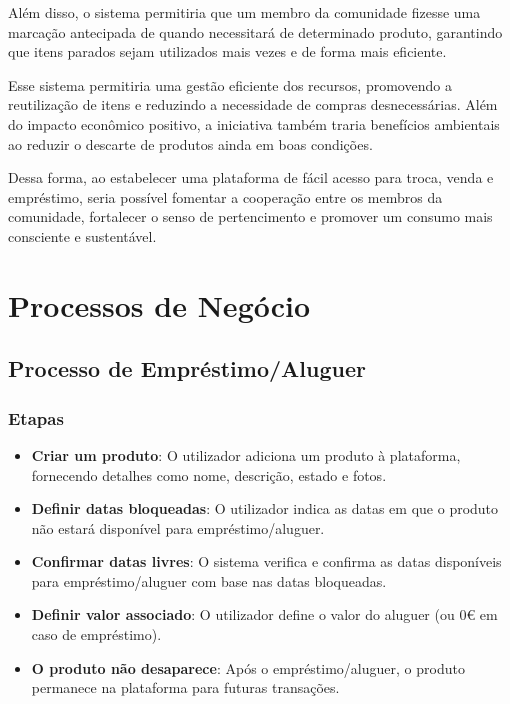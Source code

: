 \documentclass[a4paper, 12pt]{article} %
\begin{document}
Além disso, o sistema permitiria que um membro da comunidade fizesse uma marcação antecipada de quando necessitará de determinado produto, garantindo que itens parados sejam utilizados mais vezes e de forma mais eficiente. 

Esse sistema permitiria uma gestão eficiente dos recursos, promovendo a reutilização de itens e reduzindo a necessidade de compras desnecessárias. Além do impacto econômico positivo, a iniciativa também traria benefícios ambientais ao reduzir o descarte de produtos ainda em boas condições.

Dessa forma, ao estabelecer uma plataforma de fácil acesso para troca, venda e empréstimo, seria possível fomentar a cooperação entre os membros da comunidade, fortalecer o senso de pertencimento e promover um consumo mais consciente e sustentável.



\newpage
\section{Processos de Negócio}

\subsection{Processo de Empréstimo/Aluguer}

\subsubsection{Etapas}
\begin{itemize}
	\item \textbf{Criar um produto}: O utilizador adiciona um produto à plataforma, fornecendo detalhes como nome, descrição, estado e fotos.
	\item \textbf{Definir datas bloqueadas}: O utilizador indica as datas em que o produto não estará disponível para empréstimo/aluguer.
	\item \textbf{Confirmar datas livres}: O sistema verifica e confirma as datas disponíveis para empréstimo/aluguer com base nas datas bloqueadas.
	\item \textbf{Definir valor associado}: O utilizador define o valor do aluguer (ou 0€ em caso de empréstimo).
	\item \textbf{O produto não desaparece}: Após o empréstimo/aluguer, o produto permanece na plataforma para futuras transações.
\end{itemize}
\end{document}
